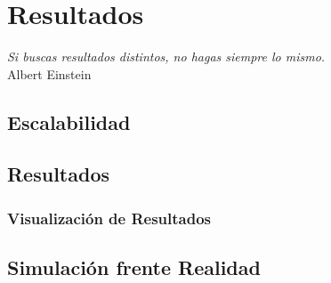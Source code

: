 
\chapter*{Resultados} \label{cap6}

\begin{flushright}
\begin{minipage}{7.85cm}
    {\em Si buscas resultados distintos, no hagas siempre lo mismo.} \\ Albert
    Einstein
\end{minipage}
\end{flushright}

\vspace*{5mm}

\section*{Escalabilidad}
\section*{Resultados}
\subsection*{Visualización de Resultados}
\section*{Simulación frente Realidad}

